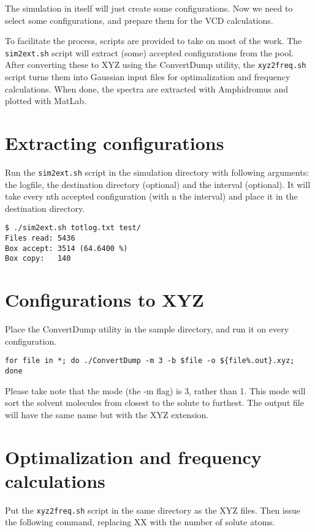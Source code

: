 
The simulation in itself will just create some configurations. Now we need to 
select some configurations, and prepare them for the VCD calculations.

To facilitate the process, scripts are provided to take on most of the work. 
The \verb|sim2ext.sh| script will extract (some) accepted configurations from 
the 
pool. After converting these to XYZ using the ConvertDump utility, the 
\verb|xyz2freq.sh| script turns them into Gaussian input files for 
optimalization and frequency calculations.
When done, the spectra are extracted with Amphidromus and plotted with MatLab.

\section{Extracting configurations}

Run the \verb|sim2ext.sh| script in the simulation directory with following 
arguments: the logfile, the destination directory (optional) and the interval 
(optional). It will take every nth accepted configuration (with n the interval)
and place it in the destination directory.

\begin{lstlisting}[caption=The sim2ext script]
$ ./sim2ext.sh totlog.txt test/
Files read: 5436
Box accept: 3514 (64.6400 %)
Box copy:   140
\end{lstlisting}

\section{Configurations to XYZ}

Place the ConvertDump utility in the sample directory, and run it on every 
configuration.

\begin{lstlisting}[caption=Using the ConvertDump utility to make XYZ's]
for file in *; do ./ConvertDump -m 3 -b $file -o ${file%.out}.xyz; done
\end{lstlisting}

Please take note that the mode (the -m flag) is 3, rather than 1. This mode 
will sort the solvent molecules from closest to the solute to furthest. 
The output file will have the same name but with the XYZ extension.

\section{Optimalization and frequency calculations}
Put the \verb|xyz2freq.sh| script in the same directory as the XYZ files. Then 
issue the following command, replacing XX with the number of solute atoms.

